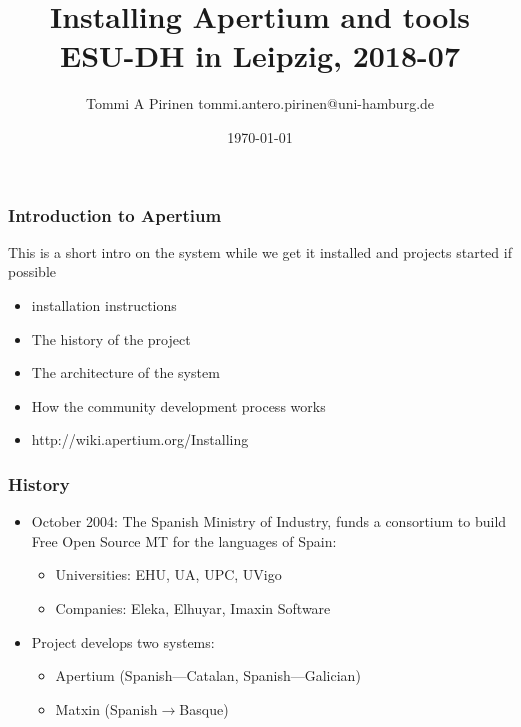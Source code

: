 \documentclass[10pt,xetex]{beamer} %
\title{Installing Apertium and tools\\
\scriptsize{ESU-DH in Leipzig, 2018-07}}
\author{Tommi A Pirinen \scriptsize \guilsinglleft
tommi.antero.pirinen@uni-hamburg.de
\guilsinglright}
\institute{Hamburger Zentrum für Sprachkorpora, CLARIN-D}
\date{\today}
\begin{document}
\begin{frame}
        \titlepage
\end{frame}



\begin{frame}
  \frametitle{Introduction to Apertium}

  This is a short intro on the system while we get it installed and
    projects started if possible

\begin{itemize}
    \item installation instructions
  \item The history of the project
  \item The architecture of the system
  \item How the community development process works
\end{itemize}

\end{frame}


\begin{frame}
    \begin{itemize}
        \item http://wiki.apertium.org/Installing
    \end{itemize}
\end{frame}


\begin{frame}
  \frametitle{History}

  \begin{itemize}
  \item October 2004: The Spanish Ministry of Industry, funds a consortium to
      build Free Open Source MT for the languages of Spain:
     \begin{itemize}
     \item Universities: EHU, UA, UPC, UVigo
     \item Companies: Eleka, Elhuyar, Imaxin Software
     \end{itemize}
   \item Project develops two systems:
     \begin{itemize}
     \item Apertium (Spanish---Catalan, Spanish---Galician)
     \item Matxin (Spanish$\rightarrow$Basque)
     \end{itemize}
 \end{itemize}

\end{frame}
\end{document}
